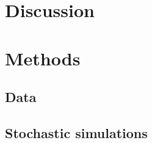 \documentclass[aps,pre,twocolumn]{revtex4-1}
\def\be{\begin{equation}}
\def\ee{\end{equation}}
\begin{document}
\section{Discussion}


\section{Methods}
\subsection{Data}

\subsection{Stochastic simulations}
%
%
%
% 
\end{document}
